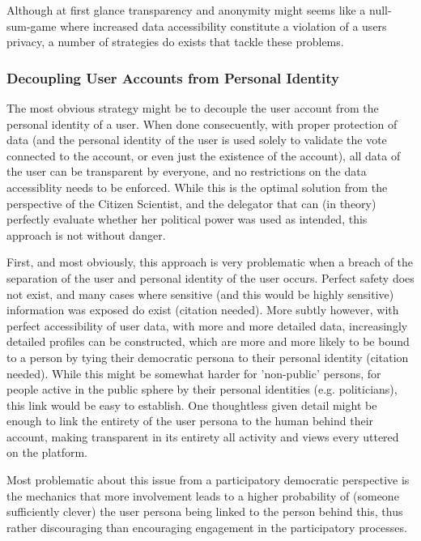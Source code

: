 Although at first glance transparency and anonymity might seems like a null-sum-game where increased data accessibility constitute a violation of a users privacy, a number of strategies do exists that tackle these problems.

\subsubsection{Decoupling User Accounts from Personal Identity}

The most obvious strategy might be to decouple the user account from the personal identity of a user. When done consecuently, with proper protection of data (and the personal identity of the user is used solely to validate the vote connected to the account, or even just the existence of the account), all data of the user can be transparent by everyone, and no restrictions on the data accessiblity needs to be enforced. While this is the optimal solution from the perspective of the Citizen Scientist, and the delegator that can (in theory) perfectly evaluate whether her political power was used as intended, this approach is not without danger.

First, and most obviously, this approach is very problematic when a breach of the separation of the user and personal identity of the user occurs. Perfect safety does not exist, and many cases where sensitive (and this would be highly sensitive) information was exposed do exist (citation needed). More subtly however, with perfect accessibility of user data, with more and more detailed data, increasingly detailed profiles can be constructed, which are more and more likely to be bound to a person by tying their democratic persona to their personal identity (citation needed). While this might be somewhat harder for 'non-public' persons, for people active in the public sphere by their personal identities (e.g. politicians), this link would be easy to establish. One thoughtless given detail might be enough to link the entirety of the user persona to the human behind their account, making transparent in its entirety all activity and views every uttered on the platform. 

Most problematic about this issue from a participatory democratic perspective is the mechanics that more involvement leads to a higher probability of (someone sufficiently clever) the user persona being linked to the person behind this, thus rather discouraging than encouraging engagement in the participatory processes.

